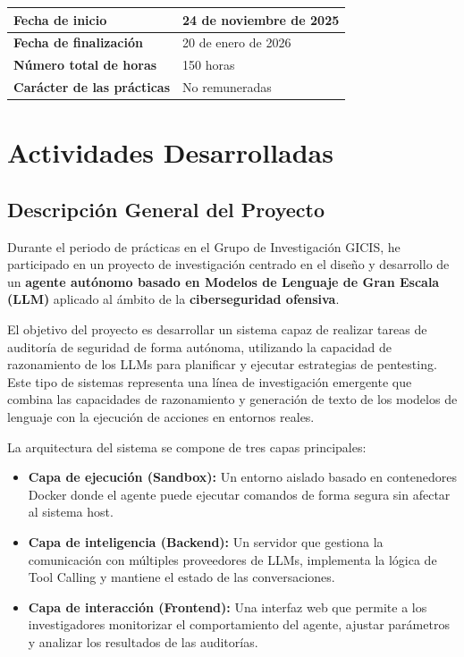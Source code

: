 \documentclass[12pt,a4paper]{article}
\begin{document}
\begin{table}[h]
\centering
\begin{tabularx}{\textwidth}{|l|X|}
\hline
\textbf{Fecha de inicio} & 24 de noviembre de 2025 \\
\hline
\textbf{Fecha de finalización} & 20 de enero de 2026 \\
\hline
\textbf{Número total de horas} & 150 horas \\
\hline
\textbf{Carácter de las prácticas} & No remuneradas \\
\hline
\end{tabularx}
\end{table}

\newpage

\section{Actividades Desarrolladas}

\subsection{Descripción General del Proyecto}

Durante el periodo de prácticas en el Grupo de Investigación GICIS, he participado en un proyecto de investigación centrado en el diseño y desarrollo de un \textbf{agente autónomo basado en Modelos de Lenguaje de Gran Escala (LLM)} aplicado al ámbito de la \textbf{ciberseguridad ofensiva}.

El objetivo del proyecto es desarrollar un sistema capaz de realizar tareas de auditoría de seguridad de forma autónoma, utilizando la capacidad de razonamiento de los LLMs para planificar y ejecutar estrategias de pentesting. Este tipo de sistemas representa una línea de investigación emergente que combina las capacidades de razonamiento y generación de texto de los modelos de lenguaje con la ejecución de acciones en entornos reales.

La arquitectura del sistema se compone de tres capas principales:

\begin{itemize}
    \item \textbf{Capa de ejecución (Sandbox):} Un entorno aislado basado en contenedores Docker donde el agente puede ejecutar comandos de forma segura sin afectar al sistema host.
    
    \item \textbf{Capa de inteligencia (Backend):} Un servidor que gestiona la comunicación con múltiples proveedores de LLMs, implementa la lógica de Tool Calling y mantiene el estado de las conversaciones.
    
    \item \textbf{Capa de interacción (Frontend):} Una interfaz web que permite a los investigadores monitorizar el comportamiento del agente, ajustar parámetros y analizar los resultados de las auditorías.
\end{itemize}
\end{document}
